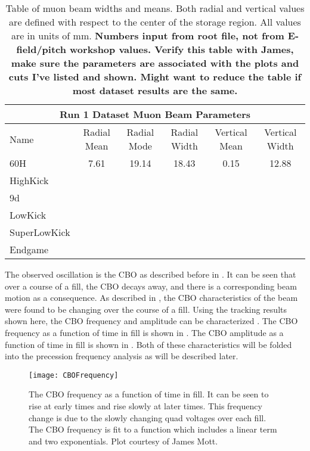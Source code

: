 \begin{landscape}
\begin{table}[]
\centering
\setlength\tabcolsep{10pt}
\renewcommand{\arraystretch}{1.2}
\begin{tabular*}{1\linewidth}{@{\extracolsep{\fill}}lccccc}
  \hline
    \multicolumn{6}{c}{\textbf{Run 1 Dataset Muon Beam Parameters}} \\
  \hline\hline
    Name & Radial Mean & Radial Mode & Radial Width & Vertical Mean & Vertical Width \\
  \hline
    60H & 7.61 & 19.14 & 18.43 & 0.15 & 12.88 \\
    HighKick &  &  &  &  &  \\
    9d &  &  &  &  &  \\
    LowKick &  &  &  &  &  \\
    SuperLowKick & &  &  &  &  \\
    Endgame &  &  &  &  &  \\
  \hline
\end{tabular*}
\caption[Run 1 dataset muon beam parameters]{Table of muon beam widths and means. Both radial and vertical values are defined with respect to the center of the storage region. All values are in units of mm. \textbf{Numbers input from root file, not from E-field/pitch workshop values. Verify this table with James, make sure the parameters are associated with the plots and cuts I've listed and shown. Might want to reduce the table if most dataset results are the same.}}
\label{tab:MuonBeamParameters}
\end{table}
\end{landscape}




The observed oscillation is the CBO as described before in . It can be seen that over a course of a fill, the CBO decays away, and there is a corresponding beam motion as a consequence. As described in , the CBO characteristics of the beam were found to be changing over the course of a fill. Using the tracking results shown here, the CBO frequency and amplitude can be characterized \cite{cbofrequency}. The CBO frequency as a function of time in fill is shown in . The CBO amplitude as a function of time in fill is shown in . Both of these characteristics will be folded into the precession frequency analysis as will be described later.



\begin{figure}[]
    \centering
    \texttt{[image: CBOFrequency]}
    \caption[CBO frequency as a function of time]{The CBO frequency as a function of time in fill. It can be seen to rise at early times and rise slowly at later times. This frequency change is due to the slowly changing quad voltages over each fill. The CBO frequency is fit to a function which includes a linear term and two exponentials. Plot courtesy of James Mott.}
    \label{fig:CBOFrequency}
\end{figure}




